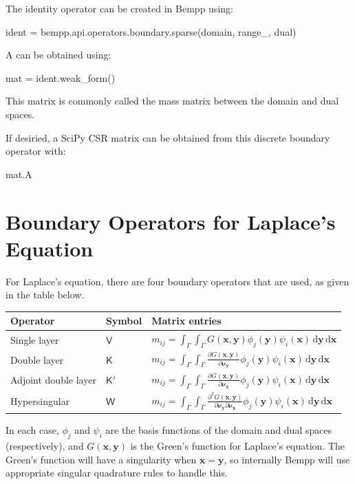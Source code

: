 \documentclass[a4paper]{book}
\begin{document}
The identity operator can be created in Bempp using:
\begin{python}
ident = bempp.api.operators.boundary.sparse(domain, range_, dual)
\end{python}

A  can be obtained using:
\begin{python}
mat = ident.weak_form()
\end{python}
This matrix is commonly called the mass matrix between the domain and dual spaces.

If desiried, a SciPy CSR matrix can be obtained from this discrete boundary operator with:
\begin{python}
mat.A
\end{python}


\section{Boundary Operators for Laplace's Equation}

For Laplace's equation, there are four boundary operators that are used, as given in the table
below.

\begin{center}
\begin{tabular}{|l|l|l|}
\hline
Operator             & Symbol        & Matrix entries\\
\hline
Single layer         & $\mathsf{V}$  & $\displaystyle m_{ij}=\int_{\Gamma}\int_{\Gamma}G(\mathbf{x},\mathbf{y})\phi_j(\mathbf{y})\psi_i(\mathbf{x})\,\mathrm{d}\mathbf{y}\,\mathrm{d}\mathbf{x}$\\
Double layer         & $\mathsf{K}$  & $\displaystyle m_{ij}=\int_{\Gamma}\int_{\Gamma}\frac{\partial G(\mathbf{x},\mathbf{y})}{\partial\mathbf{\nu}_{\mathbf{y}}}\phi_j(\mathbf{y})\psi_i(\mathbf{x})\,\mathrm{d}\mathbf{y}\,\mathrm{d}\mathbf{x}$\\
Adjoint double layer & $\mathsf{K}'$ & $\displaystyle m_{ij}=\int_{\Gamma}\int_{\Gamma}\frac{\partial G(\mathbf{x},\mathbf{y})}{\partial\mathbf{\nu}_{\mathbf{x}}}\phi_j(\mathbf{y})\psi_i(\mathbf{x})\,\mathrm{d}\mathbf{y}\,\mathrm{d}\mathbf{x}$\\
Hypersingular        & $\mathsf{W}$  & $\displaystyle m_{ij}=\int_{\Gamma}\int_{\Gamma}\frac{\partial^2 G(\mathbf{x},\mathbf{y})}{\partial\mathbf{\nu}_{\mathbf{y}}\partial\mathbf{\nu}_{\mathbf{x}}}\phi_j(\mathbf{y})\psi_i(\mathbf{x})\,\mathrm{d}\mathbf{y}\,\mathrm{d}\mathbf{x}$\\
\hline
\end{tabular}
\end{center}
In each case,  $\phi_j$ and $\psi_i$ are the basis functions of the domain and dual spaces (respectively),
and $G(\mathbf{x},\mathbf{y})$ is the Green's function for Laplace's equation.
The Green's function will have a singularity when $\mathbf{x}=\mathbf{y}$, so internally Bempp will
use appropriate singular quadrature rules to handle this.
\end{document}

